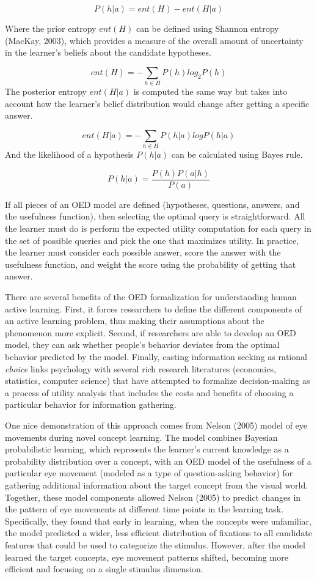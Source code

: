 \documentclass[english,floatsintext,man]{apa6}
\theoremstyle{definition}
\theoremstyle{definition}
\theoremstyle{definition}
\theoremstyle{remark}
\begin{document}
\[P(h|a) = ent(H) - ent(H|a)\]

\noindent
Where the prior entropy \(ent(H)\) can be defined using Shannon entropy
(MacKay, 2003), which provides a measure of the overall amount of
uncertainty in the learner's beliefs about the candidate hypotheses.

\[ent(H) = -\sum_{h\in H}{P(h)log_2P(h)}\] \noindent
The posterior entropy \(ent(H|a)\) is computed the same way but takes
into account how the learner's belief distribution would change after
getting a specific answer.

\[ ent(H|a) = -\sum_{h\in H}{P(h|a)logP(h|a)} \] \noindent
And the likelihood of a hypothesis \(P(h|a)\) can be calculated using
Bayes rule.

\[ P(h|a) = \frac{P(h)P(a|h)}{P(a)}  \]

\noindent

If all pieces of an OED model are defined (hypotheses, questions,
answers, and the usefulness function), then selecting the optimal query
is straightforward. All the learner must do is perform the expected
utility computation for each query in the set of possible queries and
pick the one that maximizes utility. In practice, the learner must
consider each possible answer, score the answer with the usefulness
function, and weight the score using the probability of getting that
answer.

There are several benefits of the OED formalization for understanding
human active learning. First, it forces researchers to define the
different components of an active learning problem, thus making their
assumptions about the phenomenon more explicit. Second, if researchers
are able to develop an OED model, they can ask whether people's behavior
deviates from the optimal behavior predicted by the model. Finally,
casting information seeking as rational \emph{choice} links psychology
with several rich research literatures (economics, statistics, computer
science) that have attempted to formalize decision-making as a process
of utility analysis that includes the costs and benefits of choosing a
particular behavior for information gathering.

One nice demonstration of this approach comes from Nelson (2005) model
of eye movements during novel concept learning. The model combines
Bayesian probabilistic learning, which represents the learner's current
knowledge as a probability distribution over a concept, with an OED
model of the usefulness of a particular eye movement (modeled as a type
of question-asking behavior) for gathering additional information about
the target concept from the visual world. Together, these model
components allowed Nelson (2005) to predict changes in the pattern of
eye movements at different time points in the learning task.
Specifically, they found that early in learning, when the concepts were
unfamiliar, the model predicted a wider, less efficient distribution of
fixations to all candidate features that could be used to categorize the
stimulus. However, after the model learned the target concepts, eye
movement patterns shifted, becoming more efficient and focusing on a
single stimulus dimension.
\end{document}
